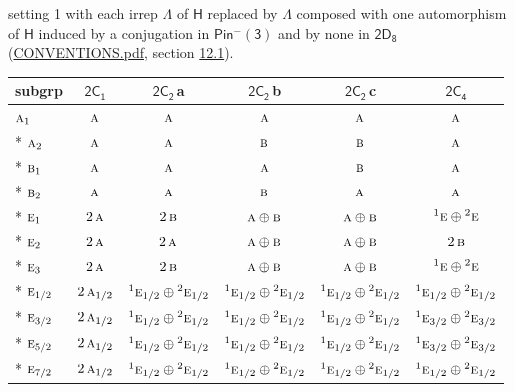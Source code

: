 \documentclass[10pt,a4paper]{article}
\numberwithin{equation}{section}
\newcommand{\grp}[1]{\mathsf{#1}}
\newcommand{\irr}[1]{\text{\normalfont\scshape #1}}
\newcommand{\conjpair}[1]{{}^{#1}}
\newcommand{\clsletter}[1]{\,{\scriptsize\color{black!55}#1}}
\begin{document}
setting 1 with each irrep $\Lambda$ of $\grp{H}$ replaced by $\Lambda$ composed with one automorphism of $\grp{H}$ induced by a conjugation in \href{Pinminus3.pdf}{$\grp{Pin^{-}(3)}$} and by none in $\grp{2D_{8}}$ (\href{../../CONVENTIONS.pdf}{CONVENTIONS.pdf}, section \href{../../../rotation/CONVENTIONS.pdf\#conv.12.1}{12.1}).
{\small\begin{longtable}{@{}lccccc@{}}\toprule
subgrp & \href{2C1.pdf}{$\grp{2C_{1}}$} & \href{2C2.pdf}{$\grp{2C_{2}}$}\clsletter{a} & \href{2C2.pdf}{$\grp{2C_{2}}$}\clsletter{b} & \href{2C2.pdf}{$\grp{2C_{2}}$}\clsletter{c} & \href{2C4.pdf}{$\grp{2C_{4}}$}\\\midrule\endhead
\bottomrule\endfoot\endlastfoot
$\irr{a}_{1}$ & $\irr{a}$ & $\irr{a}$ & $\irr{a}$ & $\irr{a}$ & $\irr{a}$\\*
$\irr{a}_{2}$ & $\irr{a}$ & $\irr{a}$ & $\irr{b}$ & $\irr{b}$ & $\irr{a}$\\*
$\irr{b}_{1}$ & $\irr{a}$ & $\irr{a}$ & $\irr{a}$ & $\irr{b}$ & $\irr{a}$\\*
$\irr{b}_{2}$ & $\irr{a}$ & $\irr{a}$ & $\irr{b}$ & $\irr{a}$ & $\irr{a}$\\*
$\irr{e}_{1}$ & $2\,\irr{a}$ & $2\,\irr{b}$ & $\irr{a}\oplus \irr{b}$ & $\irr{a}\oplus \irr{b}$ & $\conjpair{1}\irr{e}\oplus \conjpair{2}\irr{e}$\\*
$\irr{e}_{2}$ & $2\,\irr{a}$ & $2\,\irr{a}$ & $\irr{a}\oplus \irr{b}$ & $\irr{a}\oplus \irr{b}$ & $2\,\irr{b}$\\*
$\irr{e}_{3}$ & $2\,\irr{a}$ & $2\,\irr{b}$ & $\irr{a}\oplus \irr{b}$ & $\irr{a}\oplus \irr{b}$ & $\conjpair{1}\irr{e}\oplus \conjpair{2}\irr{e}$\\*
$\irr{e}_{1/2}$ & $2\,\irr{a}_{1/2}$ & $\conjpair{1}\irr{e}_{1/2}\oplus \conjpair{2}\irr{e}_{1/2}$ & $\conjpair{1}\irr{e}_{1/2}\oplus \conjpair{2}\irr{e}_{1/2}$ & $\conjpair{1}\irr{e}_{1/2}\oplus \conjpair{2}\irr{e}_{1/2}$ & $\conjpair{1}\irr{e}_{1/2}\oplus \conjpair{2}\irr{e}_{1/2}$\\*
$\irr{e}_{3/2}$ & $2\,\irr{a}_{1/2}$ & $\conjpair{1}\irr{e}_{1/2}\oplus \conjpair{2}\irr{e}_{1/2}$ & $\conjpair{1}\irr{e}_{1/2}\oplus \conjpair{2}\irr{e}_{1/2}$ & $\conjpair{1}\irr{e}_{1/2}\oplus \conjpair{2}\irr{e}_{1/2}$ & $\conjpair{1}\irr{e}_{3/2}\oplus \conjpair{2}\irr{e}_{3/2}$\\*
$\irr{e}_{5/2}$ & $2\,\irr{a}_{1/2}$ & $\conjpair{1}\irr{e}_{1/2}\oplus \conjpair{2}\irr{e}_{1/2}$ & $\conjpair{1}\irr{e}_{1/2}\oplus \conjpair{2}\irr{e}_{1/2}$ & $\conjpair{1}\irr{e}_{1/2}\oplus \conjpair{2}\irr{e}_{1/2}$ & $\conjpair{1}\irr{e}_{3/2}\oplus \conjpair{2}\irr{e}_{3/2}$\\*
$\irr{e}_{7/2}$ & $2\,\irr{a}_{1/2}$ & $\conjpair{1}\irr{e}_{1/2}\oplus \conjpair{2}\irr{e}_{1/2}$ & $\conjpair{1}\irr{e}_{1/2}\oplus \conjpair{2}\irr{e}_{1/2}$ & $\conjpair{1}\irr{e}_{1/2}\oplus \conjpair{2}\irr{e}_{1/2}$ & $\conjpair{1}\irr{e}_{1/2}\oplus \conjpair{2}\irr{e}_{1/2}$\\
\bottomrule\end{longtable}}
\end{document}
